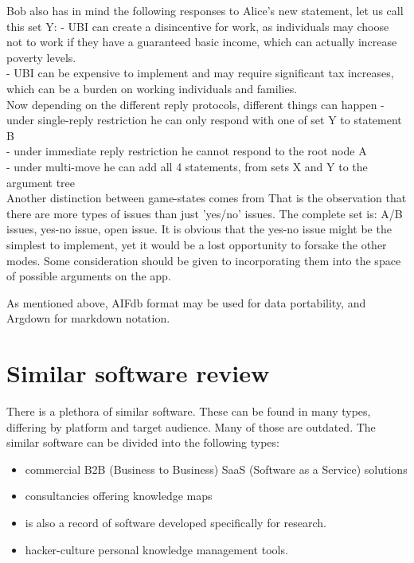 \documentclass{report}
\begin{document}
Bob also has in mind the following responses to Alice's new statement, let us call this set Y:
- UBI can create a disincentive for work, as individuals may choose not to work if they have a guaranteed basic income, which can actually increase poverty levels. \\
- UBI can be expensive to implement and may require significant tax increases, which can be a burden on working individuals and families. \\

Now depending on the different reply protocols, different things can happen
- under single-reply restriction he can only respond with one of set Y to statement B \\
- under immediate reply restriction he cannot respond to the root node A \\
- under multi-move he can add all 4 statements, from sets X and Y to the argument tree \\

Another distinction between game-states comes from \cite{wyner_argument_2015}
That is the observation that there are more types of issues than just 'yes/no' issues.
The complete set is: A/B issues, yes-no issue, open issue.
It is obvious that the yes-no issue might be the simplest to implement, yet it would be a lost opportunity to forsake the other modes.
Some consideration should be given to incorporating them into the space of possible arguments on the app.

As mentioned above, AIFdb format may be used for data portability, and Argdown for markdown notation.

\section{Similar software review}
There is a plethora of similar software. These can be found in many types, differing by platform and target audience. Many of those are outdated.
The similar software can be divided into the following types:
\begin{itemize}
  \item  commercial B2B (Business to Business) SaaS (Software as a Service) solutions 
  \item  consultancies offering knowledge maps
  \item  is also a record of software developed specifically for research.
  \item  hacker-culture personal knowledge management tools.
\end{itemize}
\end{document}
